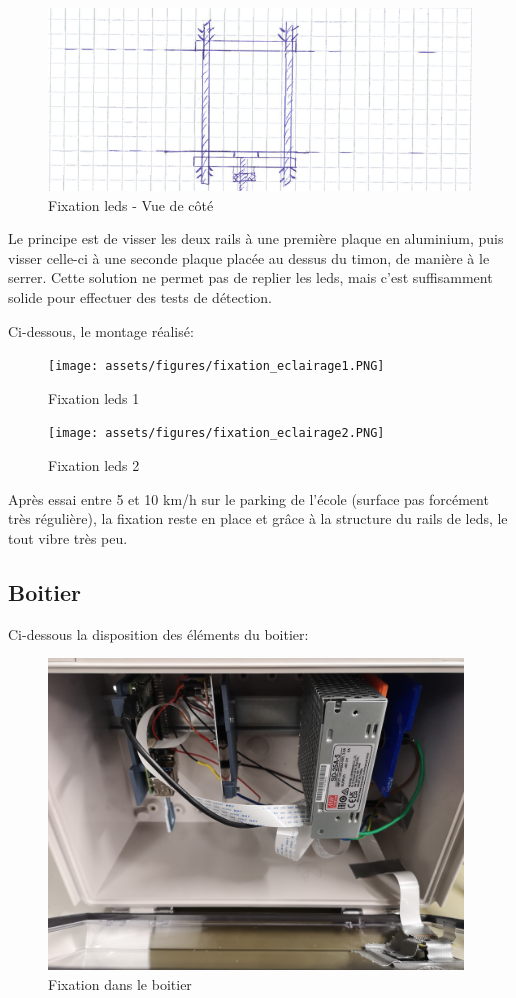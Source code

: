 \begin{figure}[H]
    \centering
    \includegraphics[width=13cm]{assets/figures/fixation_eclairage_cote.PNG}
    \caption{Fixation leds - Vue de côté}
\end{figure}

Le principe est de visser les deux rails à une première plaque en aluminium, puis visser celle-ci à une seconde plaque placée au dessus du timon,
de manière à le serrer. Cette solution ne permet pas de replier les leds, mais c'est suffisamment solide pour effectuer des tests de détection.

Ci-dessous, le montage réalisé:

\begin{figure}[H]
    \centering
    \texttt{[image: assets/figures/fixation\_eclairage1.PNG]}
    \caption{Fixation leds 1}
\end{figure}

\begin{figure}[H]
    \centering
    \texttt{[image: assets/figures/fixation\_eclairage2.PNG]}
    \caption{Fixation leds 2}
\end{figure}

Après essai entre 5 et 10 km/h sur le parking de l'école (surface pas forcément très régulière), la fixation reste en place et grâce à la structure du rails de leds, le tout vibre très peu.
\subsection{Boitier}
Ci-dessous la disposition des éléments du boitier:

\begin{figure}[H]
    \centering
    \includegraphics[width=11cm]{assets/figures/boitier_montage.jpg}
    \caption{Fixation dans le boitier}
\end{figure}

